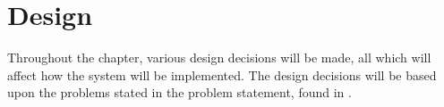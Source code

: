 \chapter{Design} \label{cha:design}

Throughout the chapter, various design decisions will be made, all which will affect how the system will be implemented. The design decisions will be based upon the problems stated in the problem statement, found in .


















